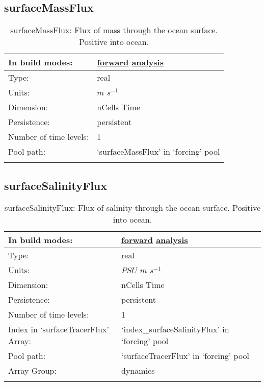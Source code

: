 \subsection[surfaceMassFlux]{surfaceMassFlux}
\label{subsec:var_sec_forcing_surfaceMassFlux}
\begin{center}
\begin{longtable}{| p{2.0in} | p{4.0in} |}
        \hline 
        In build modes: & \hyperref[subsec:forward_var_tab_forcing]{forward} \hyperref[subsec:analysis_var_tab_forcing]{analysis} \\
        \hline 
        Type: & real \\
        \hline 
        Units: & $m$ $s^{-1}$ \\
        \hline 
        Dimension: & nCells Time \\
        \hline 
        Persistence: & persistent \\
        \hline 
        Number of time levels: & 1 \\
        \hline 
            Pool path: & `surfaceMassFlux' in `forcing' pool \\
		 \hline 
    \caption{surfaceMassFlux: Flux of mass through the ocean surface. Positive into ocean.}
\end{longtable}
\end{center}
\subsection[surfaceSalinityFlux]{surfaceSalinityFlux}
\label{subsec:var_sec_forcing_surfaceSalinityFlux}
\begin{center}
\begin{longtable}{| p{2.0in} | p{4.0in} |}
        \hline 
        In build modes: & \hyperref[subsec:forward_var_tab_forcing]{forward} \hyperref[subsec:analysis_var_tab_forcing]{analysis} \\
        \hline 
        Type: & real \\
        \hline 
        Units: & $PSU$ $m$ $s^{-1}$ \\
        \hline 
        Dimension: & nCells Time \\
        \hline 
        Persistence: & persistent \\
        \hline 
        Number of time levels: & 1 \\
        \hline 
		 Index in `surfaceTracerFlux' Array: & `index\_surfaceSalinityFlux' in `forcing' pool \\
		 \hline 
            Pool path: & `surfaceTracerFlux' in `forcing' pool \\
		 \hline 
		 Array Group: & dynamics \\
		 \hline 
    \caption{surfaceSalinityFlux: Flux of salinity through the ocean surface. Positive into ocean.}
\end{longtable}
\end{center}
